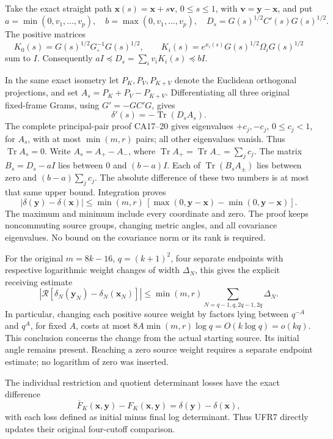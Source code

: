 Take the exact straight path \(\mathbf x(s)=\mathbf x+s\mathbf v\), \(0\le s\le1\), with \(\mathbf v=\mathbf y-\mathbf x\), and put \[
a=\min(0,v_1,\ldots,v_p),\quad b=\max(0,v_1,\ldots,v_p),\quad
D_s=G(s)^{1/2}C'(s)G(s)^{1/2}.                                   \tag{UFR4}
\] The positive matrices \[
K_0(s)=G(s)^{1/2}G_\circ^{-1}G(s)^{1/2},\qquad
K_i(s)=e^{x_i(s)}G(s)^{1/2}\Omega_iG(s)^{1/2}
\] sum to \(I\). Consequently \(aI\preceq D_s=\sum_i v_iK_i(s)\preceq bI\).

In the same exact isometry let \(P_K,P_V,P_{K+V}\) denote the Euclidean orthogonal projections, and set \(A_s=P_K+P_V-P_{K+V}\). Differentiating all three original fixed-frame Grams, using \(G'=-GC'G\), gives \[
\delta'(s)=-\operatorname{Tr}(D_sA_s).                            \tag{UFR5}
\] The complete principal-pair proof CA17--20 gives eigenvalues \(+c_j,-c_j\), \(0\le c_j<1\), for \(A_s\), with at most \(\min(m,r)\) pairs; all other eigenvalues vanish. Thus \(\operatorname{Tr}A_s=0\). Write \(A_s=A_+-A_-\), where \(\operatorname{Tr}A_+=\operatorname{Tr}A_-=\sum_jc_j\). The matrix \(B_s=D_s-aI\) lies between \(0\) and \((b-a)I\). Each of \(\operatorname{Tr}(B_sA_\pm)\) lies between zero and \((b-a)\sum_jc_j\). The absolute difference of these two numbers is at most that same upper bound. Integration proves \[
\boxed{|\delta(\mathbf y)-\delta(\mathbf x)|
 \le \min(m,r)\,[\max(0,\mathbf y-\mathbf x)-\min(0,\mathbf y-\mathbf x)] .} \tag{UFR6}
\] The maximum and minimum include every coordinate and zero. The proof keeps noncommuting source groups, changing metric angles, and all covariance eigenvalues. No bound on the covariance norm or its rank is required.

For the original \(m=8k-16\), \(q=(k+1)^2\), four separate endpoints with respective logarithmic weight changes of width \(\Delta_N\), this gives the explicit receiving estimate \[
\left|\mathcal R[\delta_N(\mathbf y_N)-\delta_N(\mathbf x_N)]\right|
 \le \min(m,r)\sum_{N=q-1,q,2q-1,2q}\Delta_N.                      \tag{UFR7}
\] In particular, changing each positive source weight by factors lying between \(q^{-A}\) and \(q^A\), for fixed \(A\), costs at most \(8A\min(m,r)\log q=O(k\log q)=o(kq)\). This conclusion concerns the change from the actual starting source. Its initial angle remains present. Reaching a zero source weight requires a separate endpoint estimate; no logarithm of zero was inserted.

The individual restriction and quotient determinant losses have the exact difference \[
\overline F_K(\mathbf x,\mathbf y)-F_K(\mathbf x,\mathbf y)
=\delta(\mathbf y)-\delta(\mathbf x),                             \tag{UFR8}
\] with each loss defined as initial minus final log determinant. Thus UFR7 directly updates their original four-cutoff comparison.

